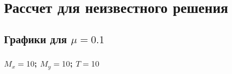 \section{Рассчет для неизвестного решения}

\subsection{Графики для $\mu=0.1$} 
\subsubsection{$M_x=10$; $M_y=10$; $T=10$}
\begin{figure}[H]
\begin{minipage}[h]{0.43\linewidth}
\end{minipage}
\hfill
\begin{minipage}[h]{0.43\linewidth}
\end{minipage}
\end{figure}

